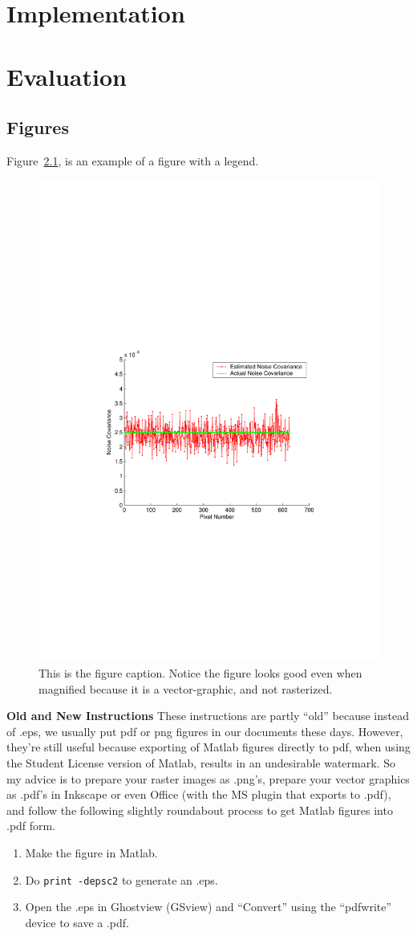 \documentclass{ucl_thesis}
\begin{document}
\chapter{Implementation}
\label{chp:impl}






\chapter{Evaluation}
\label{chp:eval}
%


\section{Figures} \label{sectionExample}

Figure~\ref{ExampleEstNoiseCovar}, is an example of a figure with a legend.

\begin{figure}[h]
\centering
\includegraphics[width=0.5\linewidth]{exampleEstNoiseCovar}
\caption{This is the figure caption. Notice the figure looks good even when magnified because it is a vector-graphic, and not rasterized.} \label{ExampleEstNoiseCovar}
\end{figure}


\textbf{Old and New Instructions} These instructions are partly ``old'' because instead of .eps, we usually put pdf or png figures in our documents these days. However, they're still useful because exporting of Matlab figures directly to pdf, when using the Student License version of Matlab, results in an undesirable watermark. So my advice is to prepare your raster images as .png's, prepare your vector graphics as .pdf's in Inkscape or even Office (with the MS plugin that exports to .pdf), and follow the following slightly roundabout process to get Matlab figures into .pdf form.
\begin{enumerate}
  \item Make the figure in Matlab.
  \item Do \texttt{print -depsc2} to generate an .eps.
  \item Open the .eps in Ghostview (GSview) and ``Convert'' using the ``pdfwrite'' device to save a .pdf.
\end{enumerate}
\end{document}
